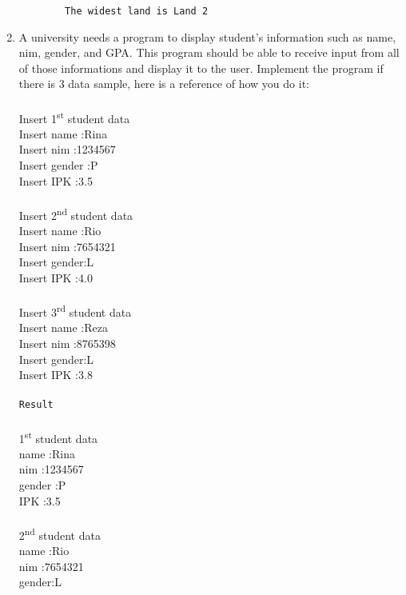 \documentclass[12pt,titlepage]{article}
\begin{document}
\begin{enumerate}
\begin{verbatim}
        The widest land is Land 2

    \end{verbatim}
    \item A university needs a program to display student’s information such as name, nim, gender, and GPA. This program should be able to receive input from all of those informations and display it to the user. Implement the program if there is 3 data sample, here is a reference of how you do it:
    \mbox{}\\ 
    \mbox{}\\ Insert 1\textsuperscript{st} student data
    \mbox{}\\ Insert name :Rina
    \mbox{}\\ Insert nim :1234567
    \mbox{}\\ Insert gender :P
    \mbox{}\\ Insert IPK :3.5
    \mbox{}\\
    \mbox{}\\ Insert 2\textsuperscript{nd} student data
    \mbox{}\\ Insert name :Rio
    \mbox{}\\ Insert nim :7654321
    \mbox{}\\ Insert gender:L
    \mbox{}\\ Insert IPK :4.0
    \mbox{}\\
    \mbox{}\\ Insert 3\textsuperscript{rd} student data
    \mbox{}\\ Insert name :Reza
    \mbox{}\\ Insert nim :8765398
    \mbox{}\\ Insert gender:L
    \mbox{}\\ Insert IPK :3.8
    \mbox{}\\ 
    \mbox{}\\ \texttt{Result} 
    \mbox{}\\ 
    \mbox{}\\ 1\textsuperscript{st} student data
    \mbox{}\\ name :Rina
    \mbox{}\\ nim :1234567
    \mbox{}\\ gender :P
    \mbox{}\\ IPK :3.5
    \mbox{}\\
    \mbox{}\\ 2\textsuperscript{nd} student data
    \mbox{}\\ name :Rio
    \mbox{}\\ nim :7654321
    \mbox{}\\ gender:L

\end{enumerate}
\end{document}
